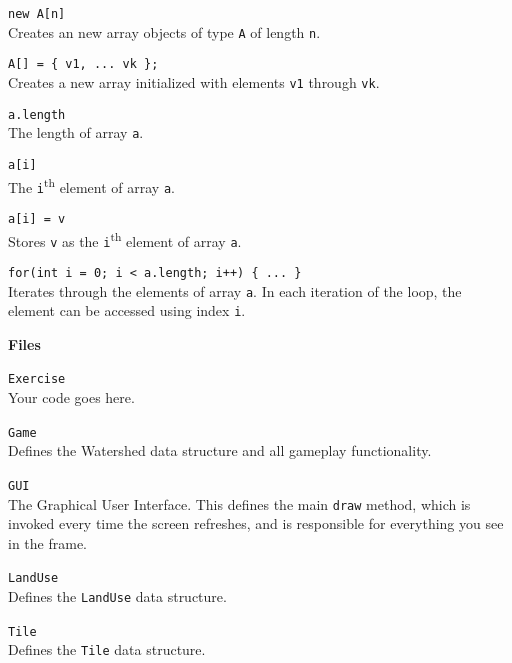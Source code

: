 \documentclass[10pt,twocolumn]{article}
\begin{document}
\begin{description}
\item{\texttt{new A[n]}} \\[.25em]
Creates an new array objects of type \texttt{A} of length
\texttt{n}. 

\item{\texttt{A[] = \{ v1, ... vk \};}} \\[.25em] 
Creates a new array initialized with elements \texttt{v1} through \texttt{vk}. 

\item{\texttt{a.length}} \\[.25em]
The length of array \texttt{a}. 

\item{\texttt{a[i]}} \\[.25em]
The \texttt{i}\textsuperscript{th} element of array \texttt{a}. 

\item{\texttt{a[i] = v}} \\[.25em]
Stores \texttt{v} as the \texttt{i}\textsuperscript{th} element of array \texttt{a}. 

\item{\texttt{for(int i = 0; i < a.length; i++) \{ ... \}}} \\[.25em]
  Iterates through the elements of array \texttt{a}. In each iteration
  of the loop, the element can be accessed using index \texttt{i}.
  
\end{description}

\noindent\textbf{\large Files}
\begin{description}
\item{\texttt{Exercise}}\ \\[.25em]
Your code goes here.

\item{\texttt{Game}}\ \\[.25em] 
Defines the Watershed data structure and all gameplay functionality.

\item{\texttt{GUI}}\ \\[.25em] 
The Graphical User Interface. This defines the main \texttt{draw} method, which is invoked every time the screen refreshes, and is responsible for everything you see in the frame.

\item{\texttt{LandUse}}\ \\[.25em] 
Defines the \texttt{LandUse} data structure.

\item{\texttt{Tile}}\ \\[.25em] 
Defines the \texttt{Tile} data structure.

\end{description}
\end{document}
